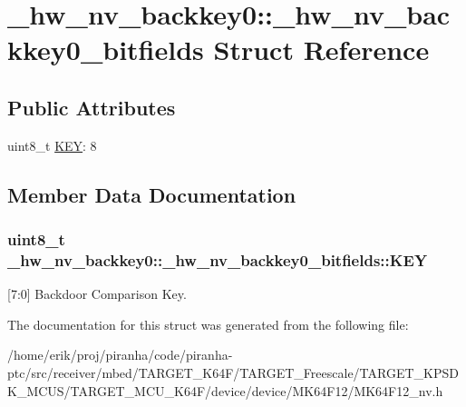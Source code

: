 \hypertarget{struct__hw__nv__backkey0_1_1__hw__nv__backkey0__bitfields}{}\section{\+\_\+hw\+\_\+nv\+\_\+backkey0\+:\+:\+\_\+hw\+\_\+nv\+\_\+backkey0\+\_\+bitfields Struct Reference}
\label{struct__hw__nv__backkey0_1_1__hw__nv__backkey0__bitfields}
\subsection*{Public Attributes}
\begin{DoxyCompactItemize}
\item 
uint8\+\_\+t \hyperlink{struct__hw__nv__backkey0_1_1__hw__nv__backkey0__bitfields_abf39ecff2f40f8c191f36aa1e626222c}{K\+EY}\+: 8
\end{DoxyCompactItemize}


\subsection{Member Data Documentation}
\subsubsection[{\texorpdfstring{K\+EY}{KEY}}]{\setlength{\rightskip}{0pt plus 5cm}uint8\+\_\+t \+\_\+hw\+\_\+nv\+\_\+backkey0\+::\+\_\+hw\+\_\+nv\+\_\+backkey0\+\_\+bitfields\+::\+K\+EY}\hypertarget{struct__hw__nv__backkey0_1_1__hw__nv__backkey0__bitfields_abf39ecff2f40f8c191f36aa1e626222c}{}\label{struct__hw__nv__backkey0_1_1__hw__nv__backkey0__bitfields_abf39ecff2f40f8c191f36aa1e626222c}
\mbox{[}7\+:0\mbox{]} Backdoor Comparison Key. 

The documentation for this struct was generated from the following file\+:\begin{DoxyCompactItemize}
\item 
/home/erik/proj/piranha/code/piranha-\/ptc/src/receiver/mbed/\+T\+A\+R\+G\+E\+T\+\_\+\+K64\+F/\+T\+A\+R\+G\+E\+T\+\_\+\+Freescale/\+T\+A\+R\+G\+E\+T\+\_\+\+K\+P\+S\+D\+K\+\_\+\+M\+C\+U\+S/\+T\+A\+R\+G\+E\+T\+\_\+\+M\+C\+U\+\_\+\+K64\+F/device/device/\+M\+K64\+F12/M\+K64\+F12\+\_\+nv.\+h\end{DoxyCompactItemize}
